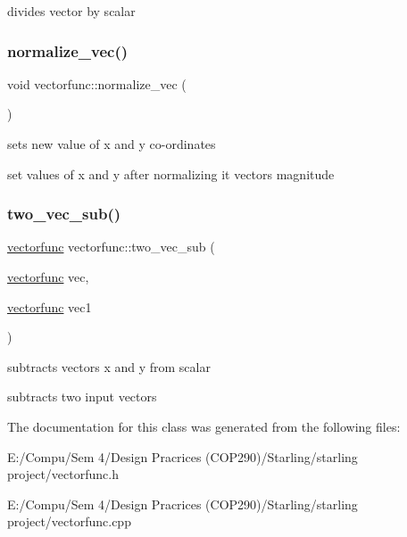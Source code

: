 divides vector by scalar \mbox{\label{classvectorfunc_a19ef4028d6623c18366fdebd0ef37eac}} 
\subsubsection{\texorpdfstring{normalize\+\_\+vec()}{normalize\_vec()}}
{\footnotesize\ttfamily void vectorfunc\+::normalize\+\_\+vec (\begin{DoxyParamCaption}{ }\end{DoxyParamCaption})}



sets new value of x and y co-\/ordinates 

set values of x and y after normalizing it vector\textquotesingle{}s magnitude \mbox{\label{classvectorfunc_a955371edddd4e7798c3bdd041de7fe80}} 
\subsubsection{\texorpdfstring{two\+\_\+vec\+\_\+sub()}{two\_vec\_sub()}}
{\footnotesize\ttfamily \mbox{\hyperlink{classvectorfunc}{vectorfunc}} vectorfunc\+::two\+\_\+vec\+\_\+sub (\begin{DoxyParamCaption}\item[{\mbox{\hyperlink{classvectorfunc}{vectorfunc}}}]{vec,  }\item[{\mbox{\hyperlink{classvectorfunc}{vectorfunc}}}]{vec1 }\end{DoxyParamCaption})}



subtracts vector\textquotesingle{}s x and y from scalar 

subtracts two input vectors 

The documentation for this class was generated from the following files\+:\begin{DoxyCompactItemize}
\item 
E\+:/\+Compu/\+Sem 4/\+Design Pracrices (\+C\+O\+P290)/\+Starling/starling project/vectorfunc.\+h\item 
E\+:/\+Compu/\+Sem 4/\+Design Pracrices (\+C\+O\+P290)/\+Starling/starling project/vectorfunc.\+cpp\end{DoxyCompactItemize}

